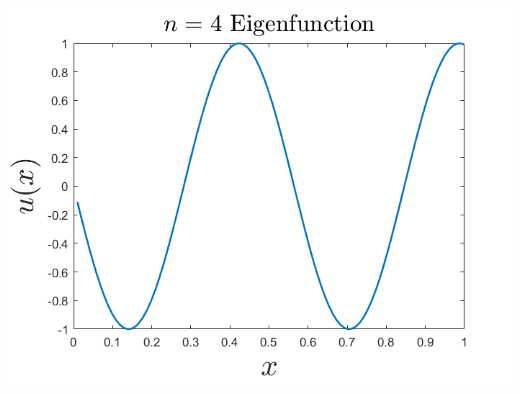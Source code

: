 \documentclass{article}
\begin{document}
\begin{enumerate}
\begin{center}
        \includegraphics[scale = 0.4]{1beig4.png}
        \newline
    \end{center}
    

\end{enumerate}
\end{document}
